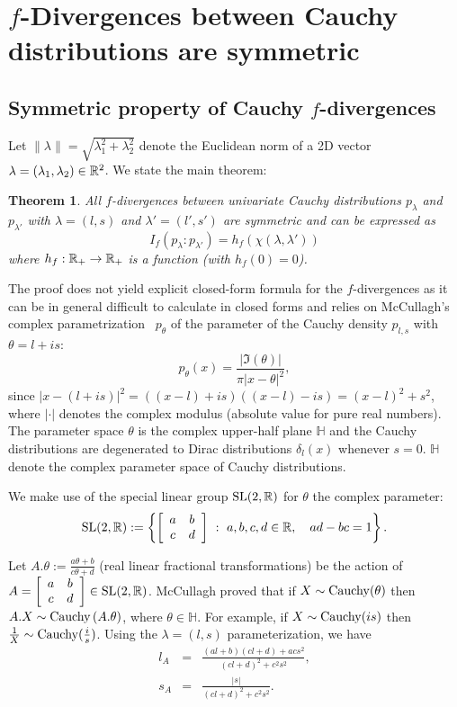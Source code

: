 \documentclass[journal]{IEEEtran}
\newtheorem{theorem}{Theorem}
\begin{document}



\section{$f$-Divergences between Cauchy distributions are symmetric}\label{sec:fdivsymmetic}


\subsection{Symmetric property of Cauchy $f$-divergences}

Let $\|\lambda\|=\sqrt{\lambda_1^2+\lambda_2^2}$ denote the Euclidean norm of a 2D vector $\lambda=(\lambda_1,\lambda_2)\in{\mathbb{R}}^2$.
We state the main theorem:
\begin{theorem}\label{thm:fdivsymmetric}
All $f$-divergences between univariate Cauchy distributions $p_\lambda$ and $p_{\lambda'}$ with $\lambda=(l,s)$ and $\lambda'=(l',s')$ are symmetric and can be expressed as 
$$
I_f(p_{\lambda} : p_{\lambda'}) = h_f\left(\chi(\lambda,\lambda')\right)
$$ 
where 
$h_f:{\mathbb{R}}_{+}\rightarrow{\mathbb{R}}_+$ is a function (with $h_f(0)=0$). 
\end{theorem}
 
 

The proof does not yield explicit closed-form formula for the $f$-divergences as it can be in general difficult to calculate in closed forms and relies on
 McCullagh's complex parametrization~\cite{McCullagh1993} $p_\theta$ of the parameter of the Cauchy density $p_{l,s}$ with $\theta=l+is$:
$$
p_\theta(x)=\frac{|\Im(\theta)|}{\pi |x - \theta|^2},
$$ 
since $|x-(l+is)|^2=((x-l)+is)((x-l)-is)=(x-l)^2+s^2$, where $|\cdot|$ denotes the complex modulus (absolute value for pure real numbers).
The parameter space $\theta$ is the complex upper-half plane $\mathbb H$ 
and the Cauchy distributions are degenerated to Dirac distributions $\delta_{l}(x)$ whenever $s=0$. 
$\mathbb{H}$ denote the complex parameter space of Cauchy distributions.

We make use of the special linear group $\mathrm{SL}(2, {\mathbb{R}})$ for $\theta$ the complex parameter:
$$
\mathrm{SL}(2, {\mathbb{R}}) := \left\{ \left[\begin{array}{cc}a & b\\ c & d\end{array}\right] \ :\  a,b,c,d\in{\mathbb{R}},\quad ad-bc=1  \right\}.
$$
 
Let $A.\theta:=\frac{a\theta+b}{c\theta+d}$ (real linear fractional transformations) be the action of $A=\left[\begin{array}{cc}a & b\\ c & d\end{array}\right]\in\mathrm{SL}(2, {\mathbb{R}})$.
McCullagh proved that if $X\sim\mathrm{Cauchy}(\theta)$ then $A.X\sim\mathrm{Cauchy}\left(A.\theta\right)$, where $\theta\in\mathbb{H}$. 
For example, if $X\sim\mathrm{Cauchy}(is)$ then $\frac{1}{X}\sim\mathrm{Cauchy}(\frac{i}{s})$. 
Using the $\lambda=(l,s)$ parameterization, we have
\begin{eqnarray*}
l_A &=&\frac{\left(a l+b\right)\left(cl+d\right)+a c s^{2}}{\left(cl+d\right)^{2}+c^{2} s^{2}},\\
s_A &=& 
\frac{|s|}{\left(c l+d\right)^{2}+c^{2} s^{2}}. 
\end{eqnarray*}
\end{document}
